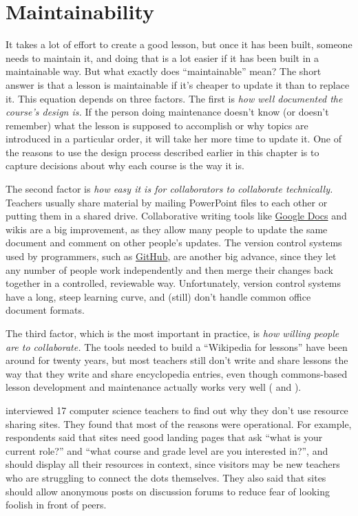 \section{Maintainability}\label{s:process-maintainability}

It takes a lot of effort to create a good lesson, but once it has been
built, someone needs to maintain it, and doing that is a lot easier if
it has been built in a maintainable way.  But what exactly does
``maintainable'' mean? The short answer is that a lesson is
maintainable if it's cheaper to update it than to replace it.  This
equation depends on three factors.  The first is \emph{how well
  documented the course's design is.} If the person doing maintenance
doesn't know (or doesn't remember) what the lesson is supposed to
accomplish or why topics are introduced in a particular order, it will
take her more time to update it. One of the reasons to use the design
process described earlier in this chapter is to capture decisions
about why each course is the way it is.

The second factor is \emph{how easy it is for collaborators to
  collaborate technically.}  Teachers usually share material by
mailing PowerPoint files to each other or putting them in a shared
drive. Collaborative writing tools like
\href{http://docs.google.com}{Google Docs} and wikis are a big
improvement, as they allow many people to update the same document and
comment on other people's updates. The version control systems used by
programmers, such as \href{http://github.com}{GitHub}, are another big
advance, since they let any number of people work independently and
then merge their changes back together in a controlled, reviewable
way. Unfortunately, version control systems have a long, steep
learning curve, and (still) don't handle common office document
formats.

The third factor, which is the most important in practice, is
\emph{how willing people are to collaborate.}  The tools needed to
build a ``Wikipedia for lessons'' have been around for twenty years,
but most teachers still don't write and share lessons the way that
they write and share encyclopedia entries, even though commons-based
lesson development and maintenance actually works very well
( and ).

\cite{Leak2017} interviewed 17 computer science teachers to find out
why they don't use resource sharing sites.  They found that most of
the reasons were operational.  For example, respondents said that
sites need good landing pages that ask ``what is your current role?''
and ``what course and grade level are you interested in?'', and should
display all their resources in context, since visitors may be new
teachers who are struggling to connect the dots themselves.  They also
said that sites should allow anonymous posts on discussion forums to
reduce fear of looking foolish in front of peers.

